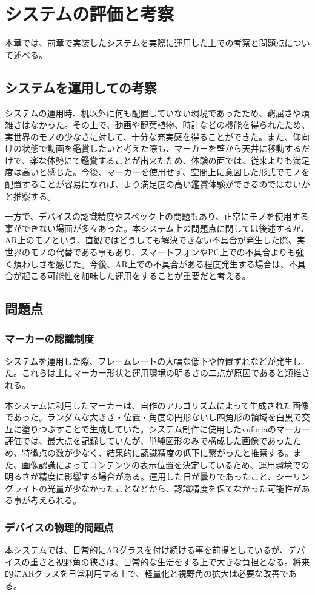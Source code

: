 
\chapter{システムの評価と考察}
\label{chap:systemEvaluation}

本章では、前章で実装したシステムを実際に運用した上での考察と問題点について述べる。

\newpage

\section{システムを運用しての考察}

システムの運用時、机以外に何も配置していない環境であったため、窮屈さや煩雑さはなかった。その上で、動画や観葉植物、時計などの機能を得られたため、実世界のモノの少なさに対して、十分な充実感を得ることができた。また、仰向けの状態で動画を鑑賞したいと考えた際も、マーカーを壁から天井に移動するだけで、楽な体勢にて鑑賞することが出来たため、体験の面では、従来よりも満足度は高いと感じた。今後、マーカーを使用せず、空間上に意図した形式でモノを配置することが容易になれば、より満足度の高い鑑賞体験ができるのではないかと推察する。

一方で、デバイスの認識精度やスペック上の問題もあり、正常にモノを使用する事ができない場面が多々あった。本システム上の問題点に関しては後述するが、AR上のモノという、直観ではどうしても解決できない不具合が発生した際、実世界のモノの代替である事もあり、スマートフォンやPC上での不具合よりも強く煩わしさを感じた。今後、AR上での不具合がある程度発生する場合は、不具合が起こる可能性を加味した運用をすることが重要だと考える。

\section{問題点}

\subsection{マーカーの認識制度}

システムを運用した際、フレームレートの大幅な低下や位置ずれなどが発生した。これらは主にマーカー形状と運用環境の明るさの二点が原因であると類推される。

本システムに利用したマーカーは、自作のアルゴリズムによって生成された画像であった。ランダムな大きさ・位置・角度の円形ないし四角形の領域を白黒で交互に塗りつぶすことで生成していた。システム制作に使用したvuforiaのマーカー評価では、最大点を記録していたが、単純図形のみで構成した画像であったため、特徴点の数が少なく、結果的に認識精度の低下に繋がったと推察する。また、画像認識によってコンテンツの表示位置を決定しているため、運用環境での明るさが精度に影響する場合がある。運用した日が曇りであったこと、シーリングライトの光量が少なかったことなどから、認識精度を保てなかった可能性がある事が考えられる。

\subsection{デバイスの物理的問題点}

本システムでは、日常的にARグラスを付け続ける事を前提としているが、デバイスの重さと視野角の狭さは、日常的な生活をする上で大きな負担となる。将来的にARグラスを日常利用する上で、軽量化と視野角の拡大は必要な改善である。
